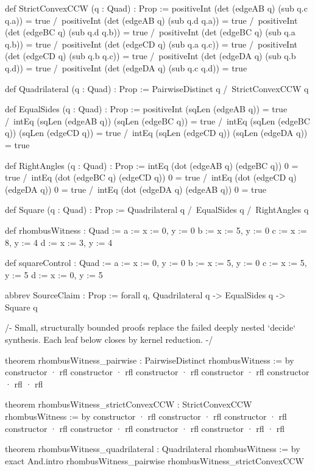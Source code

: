 \documentclass[11pt]{article}
\begin{document}
\begin{Vlean}
def StrictConvexCCW (q : Quad) : Prop :=
  positiveInt (det (edgeAB q) (sub q.c q.a)) = true /\
  positiveInt (det (edgeAB q) (sub q.d q.a)) = true /\
  positiveInt (det (edgeBC q) (sub q.d q.b)) = true /\
  positiveInt (det (edgeBC q) (sub q.a q.b)) = true /\
  positiveInt (det (edgeCD q) (sub q.a q.c)) = true /\
  positiveInt (det (edgeCD q) (sub q.b q.c)) = true /\
  positiveInt (det (edgeDA q) (sub q.b q.d)) = true /\
  positiveInt (det (edgeDA q) (sub q.c q.d)) = true

def Quadrilateral (q : Quad) : Prop :=
  PairwiseDistinct q /\ StrictConvexCCW q

def EqualSides (q : Quad) : Prop :=
  positiveInt (sqLen (edgeAB q)) = true /\
  intEq (sqLen (edgeAB q)) (sqLen (edgeBC q)) = true /\
  intEq (sqLen (edgeBC q)) (sqLen (edgeCD q)) = true /\
  intEq (sqLen (edgeCD q)) (sqLen (edgeDA q)) = true

def RightAngles (q : Quad) : Prop :=
  intEq (dot (edgeAB q) (edgeBC q)) 0 = true /\
  intEq (dot (edgeBC q) (edgeCD q)) 0 = true /\
  intEq (dot (edgeCD q) (edgeDA q)) 0 = true /\
  intEq (dot (edgeDA q) (edgeAB q)) 0 = true

def Square (q : Quad) : Prop :=
  Quadrilateral q /\ EqualSides q /\ RightAngles q

def rhombusWitness : Quad :=
  { a := { x := 0, y := 0 }
    b := { x := 5, y := 0 }
    c := { x := 8, y := 4 }
    d := { x := 3, y := 4 } }

def squareControl : Quad :=
  { a := { x := 0, y := 0 }
    b := { x := 5, y := 0 }
    c := { x := 5, y := 5 }
    d := { x := 0, y := 5 } }

abbrev SourceClaim : Prop :=
  forall q, Quadrilateral q -> EqualSides q -> Square q

/- Small, structurally bounded proofs replace the failed deeply nested
`decide` synthesis.  Each leaf below closes by kernel reduction. -/

theorem rhombusWitness_pairwise : PairwiseDistinct rhombusWitness := by
  constructor
  · rfl
  constructor
  · rfl
  constructor
  · rfl
  constructor
  · rfl
  constructor
  · rfl
  · rfl

theorem rhombusWitness_strictConvexCCW :
    StrictConvexCCW rhombusWitness := by
  constructor
  · rfl
  constructor
  · rfl
  constructor
  · rfl
  constructor
  · rfl
  constructor
  · rfl
  constructor
  · rfl
  constructor
  · rfl
  · rfl

theorem rhombusWitness_quadrilateral : Quadrilateral rhombusWitness := by
  exact And.intro rhombusWitness_pairwise rhombusWitness_strictConvexCCW


\end{Vlean}
\end{document}
